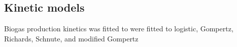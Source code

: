 \subsection{Kinetic models}
Biogas production kinetics was fitted to were fitted to logistic, Gompertz,
Richards, Schnute, and modified Gompertz